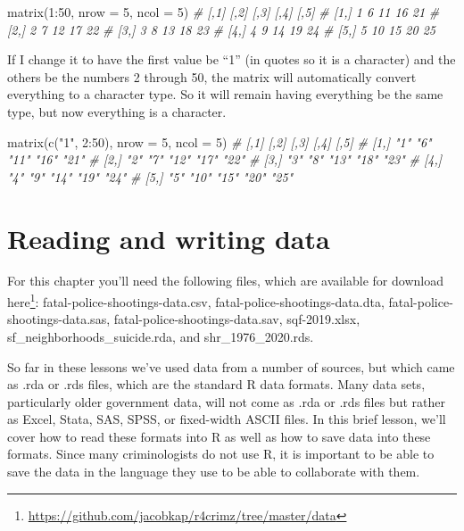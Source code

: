 \documentclass[
  a4paper,
]{krantz}
\makeatletter
\newenvironment{Shaded}{\begin{snugshade}}{\end{snugshade}}
\newcommand{\AttributeTok}[1]{\textcolor[rgb]{0.61,0.61,0.61}{#1}}
\newcommand{\CommentTok}[1]{\textcolor[rgb]{0.37,0.37,0.37}{\textit{#1}}}
\newcommand{\DecValTok}[1]{\textcolor[rgb]{0.06,0.06,0.06}{#1}}
\newcommand{\FunctionTok}[1]{\textcolor[rgb]{0,0,0}{#1}}
\newcommand{\NormalTok}[1]{#1}
\newcommand{\SpecialCharTok}[1]{\textcolor[rgb]{0,0,0}{#1}}
\newcommand{\StringTok}[1]{\textcolor[rgb]{0.5,0.5,0.5}{#1}}
\renewcommand{\href}[2]{#2\footnote{\url{#1}}}
\newenvironment{kframe}{%
\medskip{}
\setlength{\fboxsep}{.8em}
 \def\at@end@of@kframe{}%
 \ifinner\ifhmode%
  \def\at@end@of@kframe{\end{minipage}}%
  \begin{minipage}{\columnwidth}%
 \fi\fi%
 \def\FrameCommand##1{\hskip\@totalleftmargin \hskip-\fboxsep
 \colorbox{shadecolor}{##1}\hskip-\fboxsep
     \hskip-\linewidth \hskip-\@totalleftmargin \hskip\columnwidth}%
 \MakeFramed {\advance\hsize-\width
   \@totalleftmargin\z@ \linewidth\hsize
   \@setminipage}}%
 {\par\unskip\endMakeFramed%
 \at@end@of@kframe}
\renewenvironment{Shaded}{\begin{kframe}}{\end{kframe}}
\makeatother
\begin{document}
\begin{Shaded}
\begin{Highlighting}[]
\FunctionTok{matrix}\NormalTok{(}\DecValTok{1}\SpecialCharTok{:}\DecValTok{50}\NormalTok{, }\AttributeTok{nrow =} \DecValTok{5}\NormalTok{, }\AttributeTok{ncol =} \DecValTok{5}\NormalTok{)}
\CommentTok{\#      [,1] [,2] [,3] [,4] [,5]}
\CommentTok{\# [1,]    1    6   11   16   21}
\CommentTok{\# [2,]    2    7   12   17   22}
\CommentTok{\# [3,]    3    8   13   18   23}
\CommentTok{\# [4,]    4    9   14   19   24}
\CommentTok{\# [5,]    5   10   15   20   25}
\end{Highlighting}
\end{Shaded}

If I change it to have the first value be ``1'' (in quotes
so it is a character) and the others be the numbers 2
through 50, the matrix will automatically convert everything
to a character type. So it will remain having everything be
the same type, but now everything is a character.

\begin{Shaded}
\begin{Highlighting}[]
\FunctionTok{matrix}\NormalTok{(}\FunctionTok{c}\NormalTok{(}\StringTok{"1"}\NormalTok{, }\DecValTok{2}\SpecialCharTok{:}\DecValTok{50}\NormalTok{), }\AttributeTok{nrow =} \DecValTok{5}\NormalTok{, }\AttributeTok{ncol =} \DecValTok{5}\NormalTok{)}
\CommentTok{\#      [,1] [,2] [,3] [,4] [,5]}
\CommentTok{\# [1,] "1"  "6"  "11" "16" "21"}
\CommentTok{\# [2,] "2"  "7"  "12" "17" "22"}
\CommentTok{\# [3,] "3"  "8"  "13" "18" "23"}
\CommentTok{\# [4,] "4"  "9"  "14" "19" "24"}
\CommentTok{\# [5,] "5"  "10" "15" "20" "25"}
\end{Highlighting}
\end{Shaded}

\hypertarget{reading-and-writing-data}{%
\chapter{Reading and writing
data}\label{reading-and-writing-data}}

For this chapter you'll need the following files, which are
available for download
\href{https://github.com/jacobkap/r4crimz/tree/master/data}{here}:
fatal-police-shootings-data.csv,
fatal-police-shootings-data.dta,
fatal-police-shootings-data.sas,
fatal-police-shootings-data.sav, sqf-2019.xlsx,
sf\_neighborhoods\_suicide.rda, and shr\_1976\_2020.rds.

So far in these lessons we've used data from a number of
sources, but which came as .rda or .rds files, which are the
standard R data formats. Many data sets, particularly older
government data, will not come as .rda or .rds files but
rather as Excel, Stata, SAS, SPSS, or fixed-width ASCII
files. In this brief lesson, we'll cover how to read these
formats into R as well as how to save data into these
formats. Since many criminologists do not use R, it is
important to be able to save the data in the language they
use to be able to collaborate with them.
\end{document}
